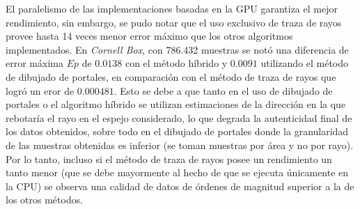 El paralelismo de las implementaciones basadas en la GPU garantiza el mejor rendimiento, sin embargo, se pudo notar que el uso exclusivo de traza de rayos provee hasta 14 veces menor error máximo que los otros algoritmos implementados. En \textit{Cornell Box}, con 786.432 muestras se notó una diferencia de error máxima $Ep$ de $0.0138$ con el método híbrido y $0.0091$ utilizando el método de dibujado de portales, en comparación con el método de traza de rayos que logró un eror de $0.000481$. Esto se debe a que tanto en el uso de dibujado de portales o el algoritmo híbrido se utilizan estimaciones de la dirección en la que rebotaría el rayo en el espejo considerado, lo que degrada la autenticidad final de los datos obtenidos, sobre todo en el dibujado de portales donde la granularidad de las muestras obtenidas es inferior (se toman muestras por área y no por rayo). Por lo tanto, incluso si el método de traza de rayos posee un rendimiento un tanto menor (que se debe mayormente al hecho de que se ejecuta únicamente en la CPU) se observa una calidad de datos de órdenes de magnitud superior a la de los otros métodos.

